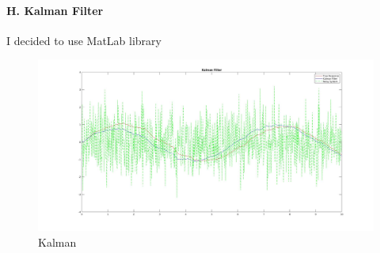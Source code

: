 \documentclass{article}
\begin{document}
\paragraph{H. Kalman Filter}
\leavevmode

\noindent
I decided to use MatLab library


\begin{figure}[hbt!]
        \centering
        \includegraphics[scale=0.2]{kalman.jpg}
        \caption{Kalman}
\end{figure}
\end{document}
